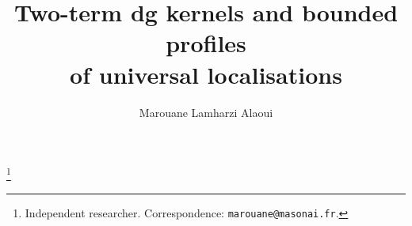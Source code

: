 \DeclareMathOperator{\HMF}{\mathbf{HMF}}
\DeclareMathOperator{\pd}{pd}
\DeclareMathOperator{\ann}{ann}
\DeclareMathOperator{\Proj}{Proj}
\newcommand{\Dk}{D_k}
\newcommand{\cU}{\mathcal U}
\newcommand{\cQ}{\mathcal Q}
\newcommand{\cG}{\mathcal G}
\newcommand{\sD}{\mathscr D}
\newcommand{\VV}{\mathbb V}
\newcommand{\PP}{\mathbb P}
\newcommand{\Gam}{\Gamma}
\newcommand{\Prof}{\mathcal P}
\newcommand{\bbZ}{\mathbb Z}
\usepackage{mathrsfs}

\title[Two-term dg kernels and bounded profiles]{Two-term dg kernels and bounded profiles\\ of universal localisations}
\author{Marouane Lamharzi Alaoui}
\thanks{Independent researcher. Correspondence: \texttt{marouane@masonai.fr}.}
\date{}
